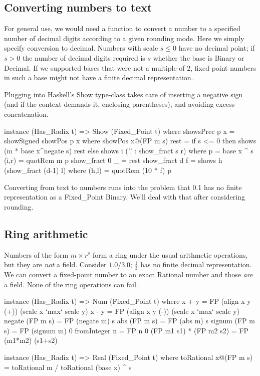 \documentclass{article}
\begin{document}
\subsection{Converting numbers to text}

For general use, we would need a function to convert a
number to a specified number of decimal digits according
to a given rounding mode.  Here we simply specify conversion
to decimal.  Numbers with scale $s \le 0$ have no decimal
point; if $s > 0$ the number of decimal digits required is
$s$ whether the base is Binary or Decimal.  If we supported
bases that were not a multiple of 2, fixed-point numbers in
such a base might not have a finite decimal representation.

Plugging into Haskell's Show type-class takes care of
inserting a negative sign (and if the context demands it,
enclosing parentheses), and avoiding excess concatenation.

\begin{code}
instance (Has_Radix t) => Show (Fixed_Point t)
  where
    showsPrec p x = showSigned showPos p x
      where showPos x@(FP m s) rest =
              if s <= 0 then shows (m * base x^negate s) rest
              else shows i ('.' : show_fract s r)
              where p = base x ^ s
                    (i,r) = quotRem m p
                    show_fract 0 _ = rest
                    show_fract d f = shows h (show_fract (d-1) l)
                      where (h,l) = quotRem (10 * f) p
\end{code}

Converting from text to numbers runs into the problem that
0.1 has no finite representation as a Fixed\_Point Binary.
We'll deal with that after considering rounding.

\subsection{Ring arithmetic}

Numbers of the form $m\times r^s$ form a ring under the usual
arithmetic operations, but they are \emph{not} a field.
Consider $1.0 / 3.0$; $\frac13$ has no finite decimal representation.
We can convert a fixed-point number to an exact Rational number and
those \emph{are} a field.  None of the ring operations can fail.

\begin{code}
instance (Has_Radix t) => Num (Fixed_Point t)
  where
    x + y = FP (align x y (+)) (scale x `max` scale y)
    x - y = FP (align x y (-)) (scale x `max` scale y)
    negate (FP m s) = FP (negate m) s
    abs    (FP m s) = FP (abs    m) s
    signum (FP m s) = FP (signum m) 0
    fromInteger n   = FP n 0
    (FP m1 s1) * (FP m2 s2)  = FP (m1*m2) (s1+s2)

instance (Has_Radix t) => Real (Fixed_Point t)
  where
    toRational x@(FP m s) = toRational m / toRational (base x) ^ s
\end{code}
\end{document}
